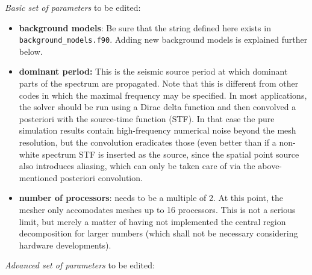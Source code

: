 \documentclass[11pt,letter,fleqn,english,notitlepage]{article}
\begin{document}
\noindent \textit{Basic set of parameters} to be edited:
\begin{itemize}
\item \textbf{background models}: Be sure that the string defined here exists in 
{\tt background\_models.f90}. Adding new background models is explained further below.

\item \textbf{dominant period:} This is the seismic source period at which dominant parts 
of the spectrum are propagated. Note that this is different from other codes in which the 
maximal frequency may be specified. 
In most applications, the solver should be run using a Dirac 
delta function and then convolved a posteriori with the source-time function (STF). In that 
case the pure simulation results contain high-frequency numerical noise beyond the mesh 
resolution, but the convolution eradicates those (even better than if a non-white spectrum 
STF is inserted as the source, since the spatial point source also introduces aliasing, which 
can only be taken care of via the above-mentioned posteriori convolution.

\item \textbf{number of processors}: needs to be a multiple of 2. At this point, the mesher 
only accomodates meshes up to 16 processors. This is not a serious limit, but 
merely a matter of having not implemented the central region decomposition 
for larger numbers (which shall not be necessary considering hardware developments).
\end{itemize}
\newpage
\noindent \textit{Advanced set of parameters} to be edited:
\end{document}
